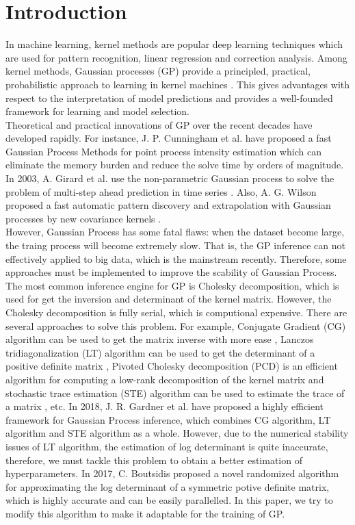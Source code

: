 \documentclass{article}
\begin{document}
\section{Introduction}
In machine learning, kernel methods are  popular deep learning techniques which are used for pattern recognition, linear regression and correction analysis. Among kernel methods, Gaussian processes (GP) provide a principled, practical, probabilistic approach to learning in kernel machines \cite{1}. This gives advantages with respect to the interpretation of model predictions and provides a well-founded framework for learning and model selection. \\
\indent Theoretical and practical innovations of GP over the recent decades have developed rapidly. For instance, J. P. Cunningham et al. have proposed a fast Gaussian Process Methods for point process intensity estimation which can eliminate the memory burden and reduce the solve time by orders of magnitude. In 2003, A. Girard et al. use the non-parametric Gaussian process to solve the problem of multi-step ahead prediction in time series \cite{2}. Also, A. G. Wilson proposed a fast automatic pattern discovery and extrapolation with Gaussian processes by new covariance kernels \cite{3}. \\
\indent However, Gaussian Process has some fatal flaws: when the dataset become large, the traing process will become extremely slow. That is, the GP inference can not effectively applied to big data, which is the mainstream recently. Therefore, some approaches must be implemented to improve the scability of Gaussian Process. \\
The most common inference engine for GP is Cholesky decomposition, which is used for get the inversion and determinant of the kernel matrix. However, the Cholesky decomposition is fully serial, which is computional expensive. There are several approaches to solve this problem. For example, Conjugate Gradient (CG) algorithm can be used to get the matrix inverse with more ease \cite{4}, Lanczos tridiagonalization (LT) algorithm can be used to get the determinant of a positive definite matrix \cite{5}, Pivoted Cholesky decomposition (PCD) is an efficient algorithm for computing a low-rank decomposition of the kernel matrix \cite{6} and stochastic trace estimation (STE) algorithm can be used to estimate the trace of a matrix \cite{7}, etc. In 2018, J. R. Gardner et al. have proposed  a highly efficient framework for Gaussian Process inference, which combines CG algorithm, LT algorithm and STE algorithm as a whole. However, due to the numerical stability issues of LT algorithm, the estimation of log determinant is quite inaccurate, therefore, we must tackle this problem to obtain a better estimation of hyperparameters. In 2017, C. Boutsidis proposed a novel randomized algorithm for approximating the log determinant of a symmetric potive definite matrix, which is highly accurate and can be easily parallelled. In this paper, we try to modify this algorithm to make it adaptable for the training of GP.\\
\end{document}
